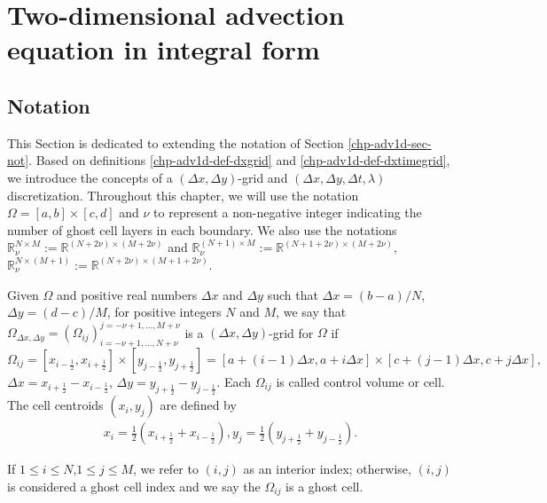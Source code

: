 \section{Two-dimensional advection equation in integral form}
\label{sec-adv2d}
\subsection{Notation}
\label{chp-adv2d-sec-not}
This Section is dedicated to extending the notation of Section \ref{chp-adv1d-sec-not}.
Based on definitions \ref{chp-adv1d-def-dxgrid} and \ref{chp-adv1d-def-dxtimegrid},
we introduce the concepts of a $(\Delta x,\Delta y)$-grid and $(\Delta x, \Delta y, \Delta t, \lambda)$ discretization.
Throughout this chapter, we will use the notation $\Omega=[a,b]\times[c,d]$
and $\nu$ to represent a non-negative integer indicating the number of ghost cell layers in each boundary.
We also use the notations $\mathbb{R}^{N\times M}_{\nu}:=\mathbb{R}^{(N+2\nu)\times (M+2\nu)}$ and
$\mathbb{R}^{(N+1)\times M}_{\nu}:=\mathbb{R}^{(N+1+2\nu)\times (M+2\nu)}$,
$\mathbb{R}^{N\times (M+1)}_{\nu}:=\mathbb{R}^{(N+2\nu)\times (M+1+2\nu)}$.
\begin{definition}
	\label{chp-adv1d-def-2dgrid}
	Given $\Omega$ and positive real numbers $\Delta x$ and $\Delta y$ such that $\Delta x = (b-a)/N$, 
	$\Delta y = (d-c)/M$, for positive integers $N$ and $M$,
	we say that $\Omega_{\Delta x, \Delta y}=(\Omega_{ij})_{i=-\nu+1,\ldots,N+\nu}^{j=-\nu+1,\ldots,M+\nu}$
	is a $(\Delta x, \Delta y)$-grid for $\Omega$ if
    \begin{equation*}
	\Omega_{ij} = [x_{i-\frac{1}{2}}, x_{i+\frac{1}{2}}]\times [y_{j-\frac{1}{2}}, y_{j+\frac{1}{2}}] =
    [a+(i-1)\Delta x,a+i\Delta x]\times [c+(j-1)\Delta x,c+j\Delta x],
    \end{equation*}
	$\Delta x = x_{i+\frac{1}{2}}-x_{i-\frac{1}{2}}$, 	$\Delta y = y_{j+\frac{1}{2}}-y_{j-\frac{1}{2}}$.
	Each $\Omega_{ij}$ is called control volume or cell.
	The cell centroids $(x_i,y_j)$ are defined by
    \begin{align*}
       x_i = \frac{1}{2}(x_{i+\frac{1}{2}} + x_{i-\frac{1}{2}}), y_j = \frac{1}{2}(y_{j+\frac{1}{2}} + y_{j-\frac{1}{2}}).
    \end{align*}
\end{definition}
\begin{remark}
If $1 \leq i \leq N$,$1 \leq j \leq M$, we refer to $(i,j)$ as an interior index;
otherwise, $(i,j)$ is considered a ghost cell index and we say the $\Omega_{ij}$ is a ghost cell.
\end{remark}
